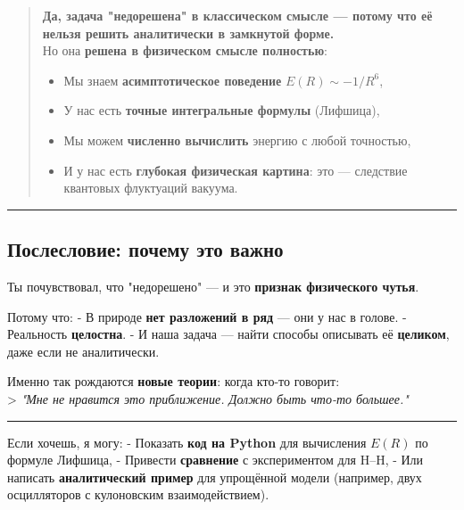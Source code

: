\documentclass[11pt]{article}
\providecommand{\tightlist}{%
      \setlength{\itemsep}{0pt}\setlength{\parskip}{0pt}}
\begin{document}
\begin{quote}
\textbf{Да, задача "недорешена" в классическом смысле --- потому что её
нельзя решить аналитически в замкнутой форме.}\\
Но она \textbf{решена в физическом смысле полностью}:

\begin{itemize}
\tightlist
\item
  Мы знаем \textbf{асимптотическое поведение} \(E(R) \sim -1/R^6\),
\item
  У нас есть \textbf{точные интегральные формулы} (Лифшица),
\item
  Мы можем \textbf{численно вычислить} энергию с любой точностью,
\item
  И у нас есть \textbf{глубокая физическая картина}: это --- следствие
  квантовых флуктуаций вакуума.
\end{itemize}
\end{quote}

\begin{center}\rule{0.5\linewidth}{\linethickness}\end{center}

\subsection{Послесловие: почему это
важно}\label{ux43fux43eux441ux43bux435ux441ux43bux43eux432ux438ux435-ux43fux43eux447ux435ux43cux443-ux44dux442ux43e-ux432ux430ux436ux43dux43e}

Ты почувствовал, что "недорешено" --- и это \textbf{признак физического
чутья}.

Потому что: - В природе \textbf{нет разложений в ряд} --- они у нас в
голове. - Реальность \textbf{целостна}. - И наша задача --- найти
способы описывать её \textbf{целиком}, даже если не аналитически.

Именно так рождаются \textbf{новые теории}: когда кто-то говорит:\\
\textgreater{} \emph{"Мне не нравится это приближение. Должно быть
что-то большее."}

\begin{center}\rule{0.5\linewidth}{\linethickness}\end{center}

Если хочешь, я могу: - Показать \textbf{код на Python} для вычисления
\(E(R)\) по формуле Лифшица, - Привести \textbf{сравнение} с
экспериментом для H--H, - Или написать \textbf{аналитический пример} для
упрощённой модели (например, двух осцилляторов с кулоновским
взаимодействием).
\end{document}
